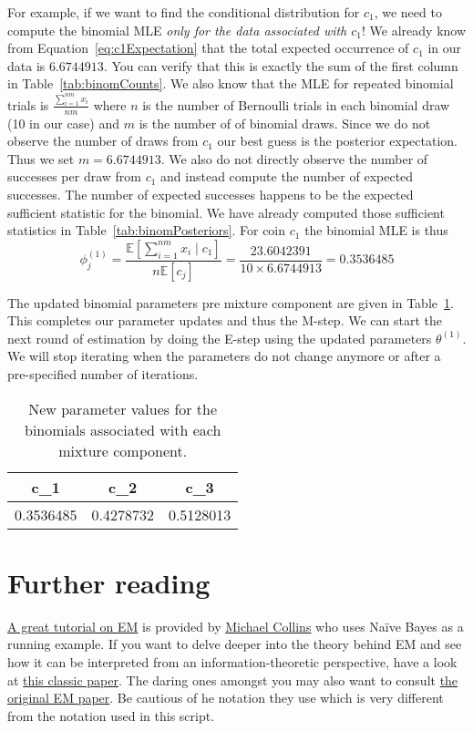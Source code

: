 \documentclass[11pt,leqno,a4paper]{report}\usepackage[]{graphicx}\usepackage[]{color}
\newcommand{\E}{\mathbb{E}}
\begin{document}
For example, if we want to find the conditional distribution for $ c_{1} $, we need to compute the binomial MLE \textit{only
for the data associated with $ c_{1} $}! We already know from Equation~\eqref{eq:c1Expectation} that the total expected 
occurrence of $ c_{1} $ in our data is $ 6.6744913 $. You can verify that this is exactly the sum of the first column in
Table~\ref{tab:binomCounts}. We also know that the MLE for repeated binomial trials is $ \frac{\sum^{nm}_{i=1}x_{i}}{nm} $ where
$ n $ is the number of Bernoulli trials in each binomial draw (10 in our case) and $ m $ is the number of of binomial draws. Since we do
not observe the number of draws from $ c_{1} $ our best guess is the posterior expectation. Thus we set $ m = 6.6744913 $. We also do not
directly observe the number of successes per draw from $ c_{1} $ and instead compute the number of expected successes. The number of 
expected successes happens to be the expected sufficient statistic for the binomial. We have already computed those sufficient statistics
in Table~\ref{tab:binomPosteriors}. For coin $ c_{1} $ the binomial MLE is thus
\begin{equation}
\phi_{j}^{(1)} =  \frac{\E\left[\sum_{i=1}^{nm} x_{i}\mid c_{1}\right]}{n\E\left[c_{j}\right]} 
= \frac{23.6042391}{10 \times 6.6744913}
= 0.3536485
\end{equation}

The updated binomial parameters pre mixture component are given in Table~\ref{tab:newBinoms}. This completes our parameter
updates and thus the M-step. We can start the next round of estimation by doing the E-step using the
updated parameters $ \theta^{(1)} $. We will stop iterating when the parameters do not change anymore or
after a pre-specified number of iterations.

\begin{table}
\center

\begin{tabular}{c|c|c}
\hline
c\_1 & c\_2 & c\_3\\
\hline
0.3536485 & 0.4278732 & 0.5128013\\
\hline
\end{tabular}


\caption{New parameter values for the binomials associated with each mixture component.}
\label{tab:newBinoms}
\end{table}

\section*{Further reading}
\href{http://www.cs.columbia.edu/~mcollins/em.pdf}{A great tutorial on EM} is provided by \href{http://www.cs.columbia.edu/~mcollins/}{Michael Collins} who
uses Na\"ive Bayes as a running example. If you want to delve deeper into the theory behind EM and see how it can be interpreted from an information-theoretic
perspective, have a look at \href{http://www.cs.toronto.edu/~fritz/absps/emk.pdf}{this classic paper}. The daring ones amongst you may also want to consult
\href{http://web.mit.edu/6.435/www/Dempster77.pdf}{the original EM paper}. Be cautious of he notation they use which is very different from the notation
used in this script.
\end{document}

